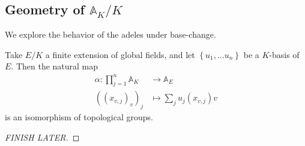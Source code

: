 \documentclass[11pt, x11names]{book}
\renewcommand{\aa}{\mathbb{A}}
\newcommand{\set}[1]{\left\{ #1 \right\}}
\begin{document}
\subsection{Geometry of $\aa_K/K$}
\label{subsection: Geometry of A_K/K}
We explore the behavior of the adeles under base-change.
\begin{lemma}
\label{A_K/K Lemma}
Take $E/K$ a finite extension of global fields, and let $\set{u_1, \ldots u_n}$ be a $K$-basis of $E$. Then the natural map
\begin{equation*}
    \begin{split}
    \alpha: \prod^n_{j=1} \aa_K &\to \aa_E\\
    ((x_{v, j})_v)_j &\mapsto \sum_j u_j(x_{v, j})v
    \end{split}
\end{equation*}
is an isomorphism of topological groups.
\end{lemma}
\begin{proof}
[FINISH LATER]
\end{proof}
\end{document}

